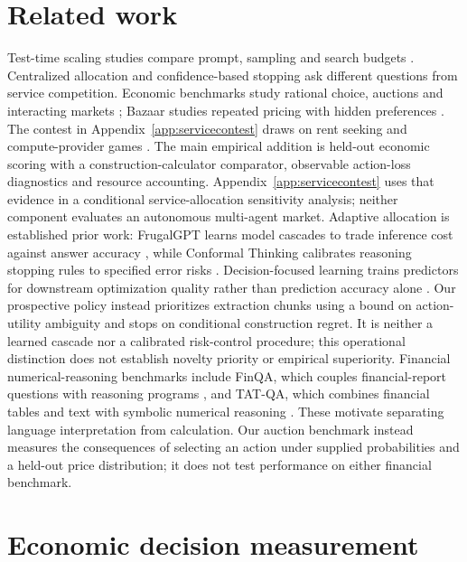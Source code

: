 \documentclass[sigconf,anonymous,nonacm]{acmart}
\begin{document}
\section{Related work}
Test-time scaling studies compare prompt, sampling and search budgets \citep{wei2022chain,snell2024scaling,wu2024inference,alomrani2025budget}. Centralized allocation \citep{wan2026shadowprice} and confidence-based stopping \citep{jurayj2025finalanswer} ask different questions from service competition. Economic benchmarks study rational choice, auctions and interacting markets \citep{fish2025econevals,chen2024aucarena,zhu2024synthetic}; Bazaar studies repeated pricing with hidden preferences \citep{ahmed2026bazaar}. The contest in Appendix~\ref{app:servicecontest} draws on rent seeking \citep{tullock1980efficient} and compute-provider games \citep{artola2026games}.
The main empirical addition is held-out economic scoring with a construction-calculator comparator, observable action-loss diagnostics and resource accounting. Appendix~\ref{app:servicecontest} uses that evidence in a conditional service-allocation sensitivity analysis; neither component evaluates an autonomous multi-agent market.
Adaptive allocation is established prior work: FrugalGPT learns model cascades to trade inference cost against answer accuracy \citep{chen2023frugalgpt}, while Conformal Thinking calibrates reasoning stopping rules to specified error risks \citep{wang2026conformalthinking}. Decision-focused learning trains predictors for downstream optimization quality rather than prediction accuracy alone \citep{wilder2019melding}. Our prospective policy instead prioritizes extraction chunks using a bound on action-utility ambiguity and stops on conditional construction regret. It is neither a learned cascade nor a calibrated risk-control procedure; this operational distinction does not establish novelty priority or empirical superiority.
Financial numerical-reasoning benchmarks include FinQA, which couples financial-report questions with reasoning programs \citep{chen2021finqa}, and TAT-QA, which combines financial tables and text with symbolic numerical reasoning \citep{zhu2021tatqa}. These motivate separating language interpretation from calculation. Our auction benchmark instead measures the consequences of selecting an action under supplied probabilities and a held-out price distribution; it does not test performance on either financial benchmark.
\section{Economic decision measurement}
\label{sec:framework}
\end{document}
